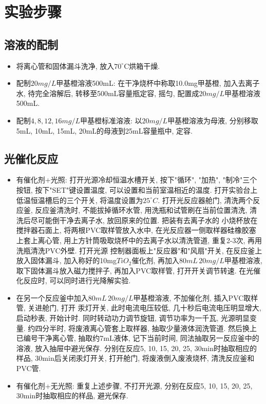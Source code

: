 \documentclass[a4paper]{article}
\begin{document}
\section{实验步骤}
\subsection{溶液的配制}
\begin{itemize}
	\item 将离心管和固体漏斗洗净, 放入$70^\circ$C烘箱干燥.
	\item 配制$20mg/L$甲基橙溶液500mL: 在干净烧杯中称取10.0mg甲基橙, 
	加入去离子水, 待完全溶解后, 转移至500mL容量瓶定容, 摇匀, 配置成$20mg/L$甲基橙溶液500mL.
	\item 配制$4, 8, 12, 16mg/L$甲基橙标准溶液: 以$20mg/L$甲基橙溶液为母液, 分别移取5mL, 
	10mL, 15mL, 20mL的母液到25mL容量瓶中, 定容.
\end{itemize}
\subsection{光催化反应}
\begin{itemize}
	\item 有催化剂+光照: 打开光源冷却恒温水槽开关, 按下"循环", "加热", "制冷"三个按钮, 
	按下"SET"键设置温度, 可以设置和当前室温相近的温度. 打开实验台上低温恒温槽后的三个开关, 
	将温度设置为$25^\circ C$. 打开光反应器舱门, 清洗两个反应釜, 反应釜清洗时, 不能拔掉循环水管, 
	用洗瓶和试管刷在当前位置清洗, 清洗后尽可能倒干净去离子水, 放回原来的位置. 把装有去离子水的
	小烧杯放在搅拌器石面上, 将两根PVC取样管放入水中, 在光反应器一侧取样器硅橡胶塞上套上离心管,
	用上方针筒吸取烧杯中的去离子水以清洗管道, 重复2-3次, 再用洗瓶清洗PVC外壁. 打开光源
	控制器面板上"反应器"和"风扇"开关, 在反应釜上放入固体漏斗, 加入称好的10mg$TiO_{2}$催化剂, 
	再加入$80mL\,20mg/L$甲基橙溶液, 取下固体漏斗放入磁力搅拌子, 再加入PVC取样管, 打开开关调节转速.
	在光催化反应时, 可以同时进行光降解实验.
	\item 在另一个反应釜中加入$80mL\,20mg/L$甲基橙溶液, 不加催化剂, 插入PVC取样管, 关进舱门, 打开
	汞灯开关, 此时电流电压较低, 几十秒后电流电压明显增大, 启动秒表, 开始计时. 同时转动功力调节旋钮, 
	调节功率为一千瓦, 光源明显变量. 约四分半时, 将废液离心管套上取样器, 抽取少量液体润洗管道. 
	然后换上已编号干净离心管, 抽取约7mL液体, 记下当前时间, 同法抽取另一反应釜中的溶液, 
	放入抽屉中避光保存. 分别在反应5, 10, 15, 20, 25, 30min时抽取相应的样品, 30min后关闭汞灯开关, 
	打开舱门, 将废液倒入废液烧杯, 清洗反应釜和PVC管.
	\item 有催化剂+无光照: 重复上述步骤, 不打开光源, 
	分别在反应5, 10, 15, 20, 25, 30min时抽取相应的样品, 避光保存.
\end{itemize}
\end{document}
